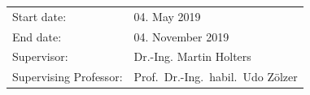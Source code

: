 \begin{titlepage}
\begin{center}
        \vfill
        \begin{tabular}{ll}
            Start date:            & 04. May 2019                       \\
            End date:              & 04. November 2019                   \\
            Supervisor:            & Dr.-Ing. Martin Holters            \\
            Supervising Professor: & Prof.~Dr.-Ing.~habil.~Udo Z\"olzer \\
        \end{tabular}
    \end{center}
    \vspace{2cm}

\end{titlepage}

